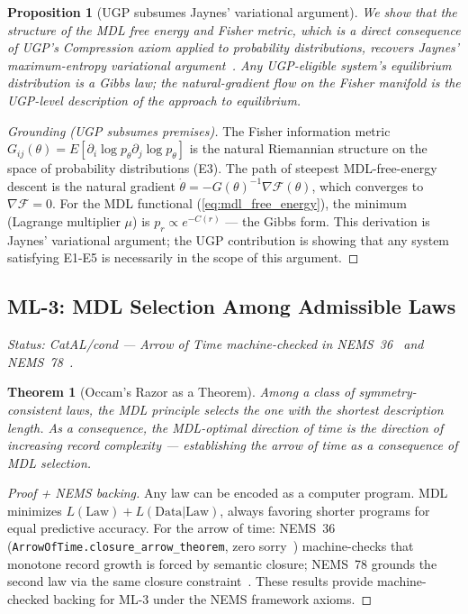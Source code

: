 \documentclass[11pt]{article}
\newtheorem{theorem}{Theorem}[section]
\newtheorem{proposition}{Proposition}[section]
\begin{document}
\begin{proposition}[UGP subsumes Jaynes' variational argument]
We show that the structure of the MDL free energy and Fisher metric, which is a direct consequence of UGP's Compression axiom applied to probability distributions, recovers Jaynes' maximum-entropy variational argument~\cite{Jaynes1957}. Any UGP-eligible system's equilibrium distribution is a Gibbs law; the natural-gradient flow on the Fisher manifold is the UGP-level description of the approach to equilibrium.
\end{proposition}
\begin{proof}[Grounding (UGP subsumes premises)]
The Fisher information metric $G_{ij}(\theta) = E[\partial_i \log p_\theta \partial_j \log p_\theta]$ is the natural Riemannian structure on the space of probability distributions (E3). The path of steepest MDL-free-energy descent is the natural gradient $\dot{\theta} = -G(\theta)^{-1} \nabla \mathcal{F}(\theta)$, which converges to $\nabla\mathcal{F}=0$. For the MDL functional (\cref{eq:mdl_free_energy}), the minimum (Lagrange multiplier $\mu$) is $p_r \propto e^{-C(r)}$ — the Gibbs form. This derivation is Jaynes' variational argument; the UGP contribution is showing that any system satisfying E1-E5 is necessarily in the scope of this argument.
\end{proof}

\subsection{ML-3: MDL Selection Among Admissible Laws}
\emph{Status: CatAL/cond — Arrow of Time machine-checked in NEMS~36~\cite{SpivackNEMS36} and NEMS~78~\cite{SpivackNEMS78}.}

\begin{theorem}[Occam's Razor as a Theorem]
Among a class of symmetry-consistent laws, the MDL principle selects the one with the shortest description length. As a consequence, the MDL-optimal direction of time is the direction of increasing record complexity — establishing the arrow of time as a consequence of MDL selection.
\end{theorem}
\begin{proof}[Proof + NEMS backing]
Any law can be encoded as a computer program. MDL minimizes $L(\text{Law}) + L(\text{Data}|\text{Law})$, always favoring shorter programs for equal predictive accuracy. For the arrow of time: NEMS~36 (\texttt{ArrowOfTime.closure\_arrow\_theorem}, zero sorry~\cite{SpivackNEMS36}) machine-checks that monotone record growth is forced by semantic closure; NEMS~78 grounds the second law via the same closure constraint~\cite{SpivackNEMS78}. These results provide machine-checked backing for ML-3 under the NEMS framework axioms.
\end{proof}
\end{document}
